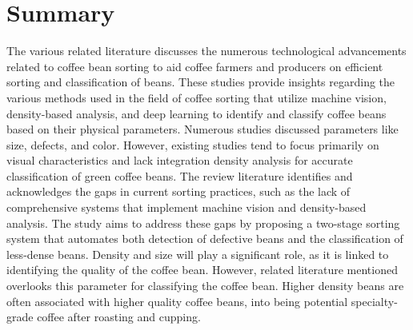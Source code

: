 \section{Summary}

The various related literature discusses the numerous technological advancements related to coffee bean sorting to aid coffee farmers and producers on efficient sorting and classification of beans. These studies provide insights regarding the various methods used in the field of coffee sorting that utilize machine vision, density-based analysis, and deep learning to identify and classify coffee beans based on their physical parameters. Numerous studies discussed parameters like size, defects, and color. However, existing studies tend to focus primarily on visual characteristics and lack integration density analysis for accurate classification of green coffee beans. The review literature identifies and acknowledges the gaps in current sorting practices, such as the lack of comprehensive systems that implement machine vision and density-based analysis. The study aims to address these gaps by proposing a two-stage sorting system that automates both detection of defective beans and the classification of less-dense beans. Density and size will play a significant role, as it is linked to identifying the quality of the coffee bean. However, related literature mentioned overlooks this parameter for classifying the coffee bean. Higher density beans are often associated with higher quality coffee beans, into being potential specialty-grade coffee after roasting and cupping. 




